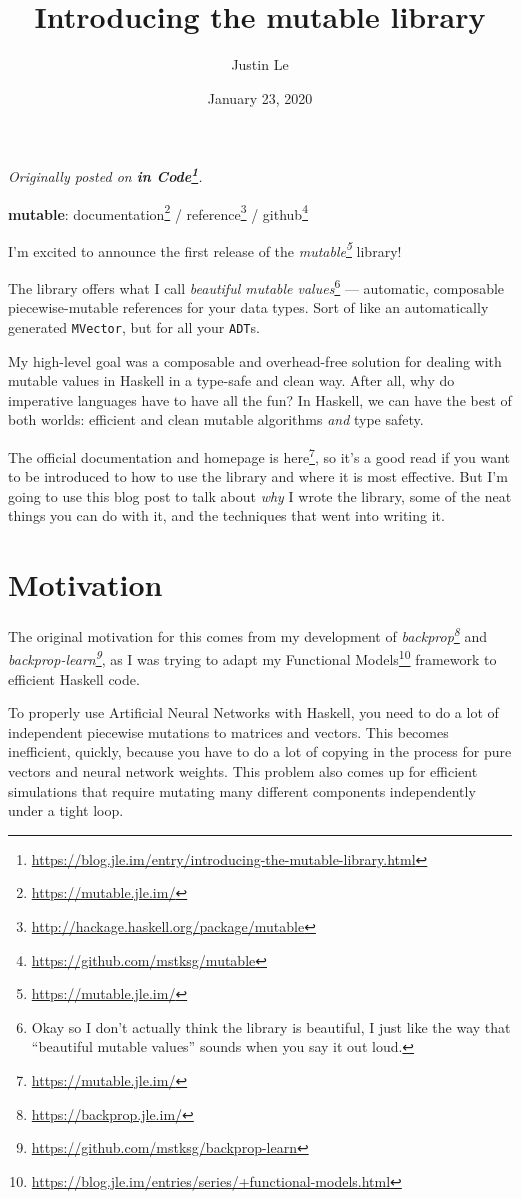 \documentclass[]{article}
\title{Introducing the mutable library}
\author{Justin Le}
\date{January 23, 2020}
\renewcommand{\href}[2]{#2\footnote{\url{#1}}}
\begin{document}
\maketitle

\emph{Originally posted on
\textbf{\href{https://blog.jle.im/entry/introducing-the-mutable-library.html}{in
Code}}.}

\textbf{mutable}: \href{https://mutable.jle.im/}{documentation} /
\href{http://hackage.haskell.org/package/mutable}{reference} /
\href{https://github.com/mstksg/mutable}{github}

I'm excited to announce the first release of the
\emph{\href{https://mutable.jle.im/}{mutable}} library!

The library offers what I call \emph{beautiful mutable values}\footnote{Okay so
  I don't actually think the library is beautiful, I just like the way that
  ``beautiful mutable values'' sounds when you say it out loud.} --- automatic,
composable piecewise-mutable references for your data types. Sort of like an
automatically generated \texttt{MVector}, but for all your \texttt{ADT}s.

My high-level goal was a composable and overhead-free solution for dealing with
mutable values in Haskell in a type-safe and clean way. After all, why do
imperative languages have to have all the fun? In Haskell, we can have the best
of both worlds: efficient and clean mutable algorithms \emph{and} type safety.

The \href{https://mutable.jle.im/}{official documentation and homepage is here},
so it's a good read if you want to be introduced to how to use the library and
where it is most effective. But I'm going to use this blog post to talk about
\emph{why} I wrote the library, some of the neat things you can do with it, and
the techniques that went into writing it.

\hypertarget{motivation}{%
\section{Motivation}\label{motivation}}

The original motivation for this comes from my development of
\emph{\href{https://backprop.jle.im/}{backprop}} and
\emph{\href{https://github.com/mstksg/backprop-learn}{backprop-learn}}, as I was
trying to adapt my
\href{https://blog.jle.im/entries/series/+functional-models.html}{Functional
Models} framework to efficient Haskell code.

To properly use Artificial Neural Networks with Haskell, you need to do a lot of
independent piecewise mutations to matrices and vectors. This becomes
inefficient, quickly, because you have to do a lot of copying in the process for
pure vectors and neural network weights. This problem also comes up for
efficient simulations that require mutating many different components
independently under a tight loop.
\end{document}
